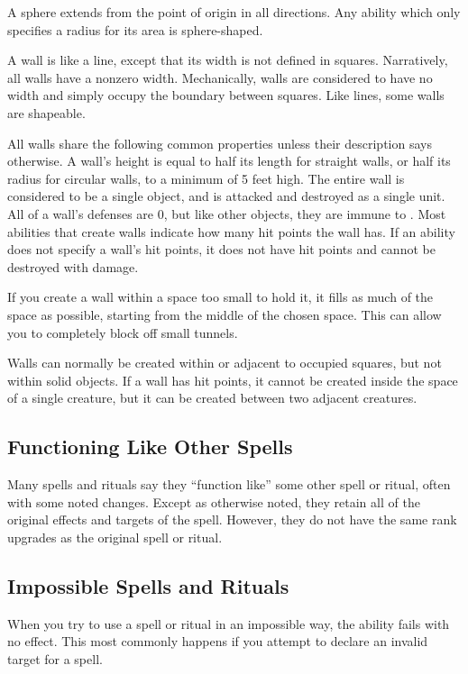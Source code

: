      A sphere extends from the point of origin in all directions.
    Any ability which only specifies a radius for its area is sphere-shaped.

     A wall is like a line, except that its width is not defined in squares.
    Narratively, all walls have a nonzero width.
    Mechanically, walls are considered to have no width and simply occupy the boundary between squares.
    Like lines, some walls are shapeable.

    All walls share the following common properties unless their description says otherwise.
    A wall's height is equal to half its length for straight walls, or half its radius for circular walls, to a minimum of 5 feet high.
    The entire wall is considered to be a single object, and is attacked and destroyed as a single unit.
    All of a wall's defenses are 0, but like other objects, they are immune to .
    Most abilities that create walls indicate how many hit points the wall has.
    If an ability does not specify a wall's hit points, it does not have hit points and cannot be destroyed with damage.

    If you create a wall within a space too small to hold it, it fills as much of the space as possible, starting from the middle of the chosen space.
    This can allow you to completely block off small tunnels.

    Walls can normally be created within or adjacent to occupied squares, but not within solid objects.
    If a wall has hit points, it cannot be created inside the space of a single creature, but it can be created between two adjacent creatures.

  \subsection{Functioning Like Other Spells}\label{Functioning Like Other Spells}
    Many spells and rituals say they ``function like'' some other spell or ritual, often with some noted changes.
    Except as otherwise noted, they retain all of the original effects and targets of the spell.
    However, they do not have the same rank upgrades as the original spell or ritual.

  \subsection{Impossible Spells and Rituals}
    When you try to use a spell or ritual in an impossible way, the ability fails with no effect.
    This most commonly happens if you attempt to declare an invalid target for a spell.

